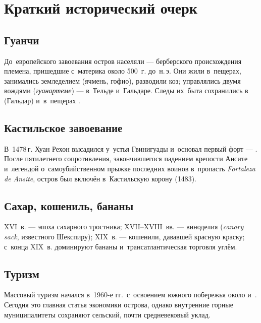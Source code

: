 \chapter{Краткий исторический очерк}

\section{Гуанчи}

До~европейского завоевания остров населяли  ---
берберского происхождения племена, пришедшие с~материка около
500~г. до~н.\,э. Они жили в~пещерах, занимались земледелием
(ячмень, гофио), разводили коз; управлялись двумя вождями
(\textit{гуанартеме}) --- в~Тельде и~Гальдаре. Следы их~быта
сохранились в~ (Гальдар) и~в~пещерах
.


\section{Кастильское завоевание}

В~1478\,г. Хуан Рехон высадился у~устья Гвинигуады и~основал
первый форт --- . После пятилетнего
сопротивления, закончившегося падением крепости Ансите и~легендой
о~самоубийственном прыжке последних воинов в~пропасть
\textit{Fortaleza de Ansite}, остров был включён в~Кастильскую
корону (1483).

\section{Сахар, кошениль, бананы}

XVI~в. --- эпоха сахарного тростника; XVII–XVIII~вв. --- виноделия
(\textit{canary sack}, известного Шекспиру); XIX~в. --- кошенили,
дававшей красную краску; с~конца XIX~в. доминируют бананы
и~трансатлантическая торговля углём.

\section{Туризм}

Массовый туризм начался в~1960-е гг.\ с~освоением южного побережья
около  и~. Сегодня это
главная статья экономики острова, однако внутренние горные
муниципалитеты сохраняют сельский, почти средневековый уклад.
